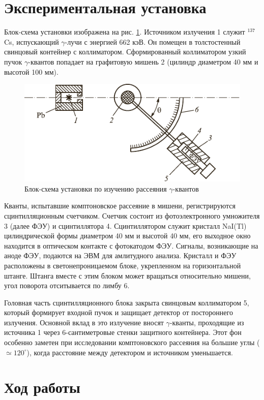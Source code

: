 \documentclass[a4paper,12pt]{article}
\begin{document}
\section{Экспериментальная установка}
Блок-схема установки изображена на рис. \ref{scheme}. Источником излучения 1 служит $^{137}$Cs, испускающий $\gamma$-лучи с энергией 662 кэВ. Он помещен в толстостенный свинцовый контейнер с коллиматором. Сформированный коллиматором узкий пучок $\gamma$-квантов попадает на графитовую мишень 2 (цилиндр диаметром 40 мм и высотой 100 мм).
\begin{figure}[!htb]
	\centering
	\includegraphics[scale=1.2]{scheme.pdf}
	\caption{Блок-схема установки по изучению рассеяния $\gamma$-квантов}
	\label{scheme}
\end{figure}
\par
Кванты, испытавшие комптоновское рассеяние в мишени, регистрируются сцинтилляционным счетчиком. Счетчик состоит из фотоэлектронного умножителя 3 (далее ФЭУ) и сцинтиллятора 4. Сцинтиллятором служит кристалл NaI(Tl) цилиндрической формы диаметром 40 мм и высотой 40 мм, его выходное окно находится в оптическом контакте с фотокатодом ФЭУ. Сигналы, возникающие на аноде ФЭУ, подаются на ЭВМ для амлитудного анализа. Кристалл и ФЭУ расположены в светонепроницаемом блоке, укрепленном на горизонтальной штанге. Штанга вместе с этим блоком может вращаться относительно мишени, угол поворота отситывается по лимбу 6.\par
Головная часть сцинтилляционного блока закрыта свинцовым коллиматором 5, который формирует входной пучок и защищает детектор от постороннего излучения. Основной вклад в это излучение вносят $\gamma$-кванты, проходящие из источника 1 через 6-сантиметровые стенки защитного контейнера. Этот фон особенно заметен при исследовании комптоновского рассеяния на большие углы ($\simeq 120^\circ$), когда расстояние между детектором и источником уменьшается.
\section{Ход работы}
\end{document}
